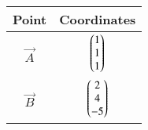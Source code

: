\begin{tabular}{ |c| c|}
    \hline
    \textbf{Point}  & \textbf{Coordinates}\\
    \hline
    $\vec{A}$ & $\begin{pmatrix}1 \\ 1 \\1\end{pmatrix}$ \\
    \hline
    $\vec{B}$ & $\begin{pmatrix}2 \\ 4 \\ -5\end{pmatrix}$\\
    \hline
\end{tabular}

